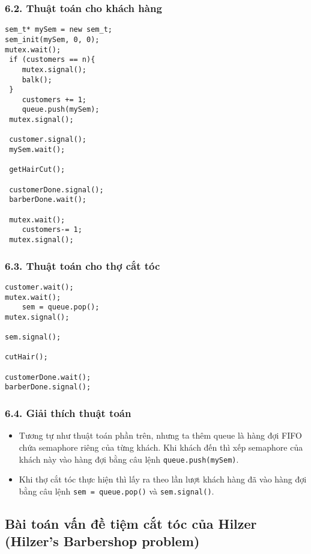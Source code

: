 \subsubsection*{6.2. Thuật toán cho khách hàng}
\begin{lstlisting}
sem_t* mySem = new sem_t;
sem_init(mySem, 0, 0);
mutex.wait();
 if (customers == n){
    mutex.signal();
    balk();
 }
    customers += 1;
    queue.push(mySem);
 mutex.signal();
 
 customer.signal();
 mySem.wait();
 
 getHairCut();
 
 customerDone.signal();
 barberDone.wait();
 
 mutex.wait();
    customers-= 1;
 mutex.signal();
\end{lstlisting}
\newpage
\subsubsection*{6.3. Thuật toán cho thợ cắt tóc}
\begin{lstlisting}
customer.wait();
mutex.wait();
    sem = queue.pop();
mutex.signal();

sem.signal();

cutHair();

customerDone.wait();
barberDone.signal();
\end{lstlisting}
\subsubsection*{6.4. Giải thích thuật toán}
\begin{itemize}
    \item Tương tự như thuật toán phần trên, nhưng ta thêm queue là hàng đợi FIFO chứa semaphore riêng của từng khách. Khi khách đến thì xếp semaphore của khách này vào hàng đợi bằng câu lệnh \texttt{queue.push(mySem)}.
    \item Khi thợ cắt tóc thực hiện thì lấy ra theo lần lượt khách hàng đã vào hàng đợi bằng câu lệnh \texttt{sem = queue.pop()} và \texttt{sem.signal()}.
\end{itemize}
\newpage
\subsection{Bài toán vấn đề tiệm cắt tóc của Hilzer (Hilzer’s Barbershop problem)}

